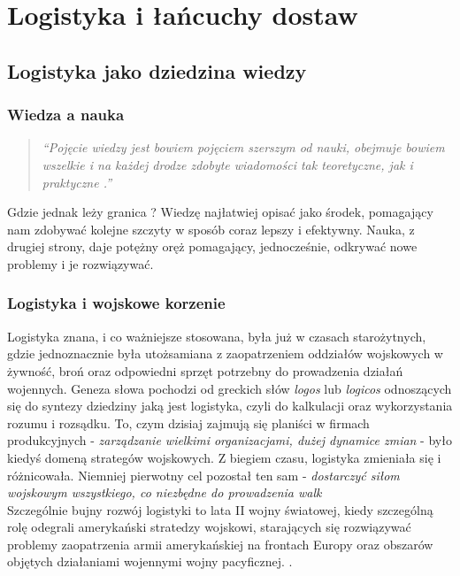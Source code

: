\chapter{Logistyka i łańcuchy dostaw}
\label{c2:c2}

\section{Logistyka jako dziedzina wiedzy}
	\subsection{Wiedza a nauka}	
		\begin{quote}
			\textit{
				``Pojęcie wiedzy jest bowiem pojęciem szerszym od nauki,
				obejmuje bowiem wszelkie i na każdej drodze zdobyte wiadomości
				tak teoretyczne, jak i praktyczne \cite{organizacja_badan_ocen_prac_naukowych}.''
			}
		\end{quote}
		
		Gdzie jednak leży granica ? Wiedzę najłatwiej opisać jako środek, pomagający 
		nam zdobywać kolejne szczyty w sposób coraz lepszy i efektywny. Nauka, z drugiej strony,
		daje potężny oręż pomagający, jednocześnie, odkrywać nowe problemy i je rozwiązywać.
		
	\subsection{Logistyka i wojskowe korzenie}
		Logistyka znana, i co ważniejsze stosowana, była już w czasach starożytnych, gdzie jednoznacznie
		była utożsamiana z zaopatrzeniem oddziałów wojskowych w żywność, broń oraz odpowiedni
		sprzęt potrzebny do prowadzenia działań wojennych. Geneza słowa pochodzi od greckich
		słów \emph{logos} lub \emph{logicos} odnoszących się do syntezy dziedziny jaką jest logistyka,
		czyli do kalkulacji oraz wykorzystania rozumu i rozsądku. To, czym dzisiaj zajmują się planiści w 
		firmach produkcyjnych - \emph{zarządzanie wielkimi organizacjami, dużej dynamice zmian} - było kiedyś 
		domeną strategów wojskowych. Z biegiem czasu, logistyka zmieniała się i różnicowała.
	    Niemniej pierwotny cel pozostał ten sam - 
		\emph{dostarczyć siłom wojskowym wszystkiego, co niezbędne do prowadzenia walk} \\
		
		Szczególnie bujny rozwój logistyki to lata II wojny światowej, kiedy szczególną rolę
		odegrali amerykański stratedzy wojskowi, starających się rozwiązywać problemy zaopatrzenia
		armii amerykańskiej na frontach Europy oraz obszarów objętych działaniami wojennymi wojny pacyficznej. 
		\cite{logistyka_w_przedsiebiorstwie}\cite{logistyka_jako_dziedzina_wiedzy_cz1}.
		
